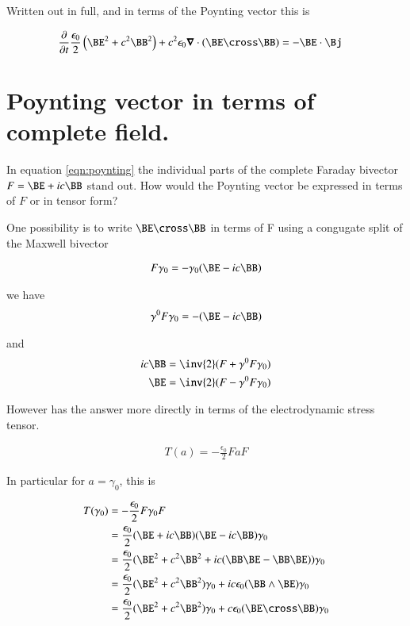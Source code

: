 \documentclass{article}
\begin{document}
Written out in full, and in terms of the Poynting vector this is

\begin{align}
\PD{t}{}\frac{\epsilon_0}{2} \left(\BE^2 + c^2 \BB^2\right) + c^2 \epsilon_0 \spacegrad \cdot (\BE \cross \BB) &= -\BE \cdot \Bj 
\end{align}

\section{ Poynting vector in terms of complete field. }

In equation \ref{eqn:poynting} the individual parts of the complete Faraday
bivector $F = \BE + i c \BB$ stand out.  How would the Poynting vector be
expressed in terms of $F$ or in tensor form?

One possibility is to write $\BE \cross \BB$ in terms of F using 
a congugate split of the Maxwell bivector

\begin{align*}
F \gamma_0 = - \gamma_0(\BE - i c \BB)
\end{align*}

we have
\begin{align*}
\gamma^0 F \gamma_0 = - (\BE - i c \BB)
\end{align*}

and
\begin{align*}
i c \BB &= \inv{2}(F + \gamma^0 F \gamma_0) \\
\BE &= \inv{2}(F - \gamma^0 F \gamma_0) \\
\end{align*}

However \cite{doran2003gap} has the answer more directly in terms of the 
electrodynamic stress tensor.

\begin{align*}
T(a) = -\frac{\epsilon_0}{2} F a F
\end{align*}

In particular for $a = \gamma_0$, this is

\begin{align*}
T(\gamma_0) 
&= -\frac{\epsilon_0}{2} F \gamma_0 F \\
&= \frac{\epsilon_0}{2} (\BE + i c\BB) (\BE - i c \BB) \gamma_0 \\
&= \frac{\epsilon_0}{2} (\BE^2 + c^2 \BB^2 + i c (\BB \BE -\BB \BE)) \gamma_0 \\
&= \frac{\epsilon_0}{2} (\BE^2 + c^2 \BB^2) \gamma_0 + i c \epsilon_0 (\BB \wedge \BE) \gamma_0 \\
&= \frac{\epsilon_0}{2} (\BE^2 + c^2 \BB^2) \gamma_0 + c \epsilon_0 (\BE \cross \BB) \gamma_0 \\
\end{align*}
\end{document}
